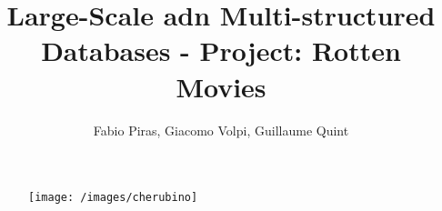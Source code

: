 

\author{Fabio Piras, Giacomo Volpi, Guillaume Quint}
\title{Large-Scale adn Multi-structured Databases - Project: Rotten Movies}
\date{}

\begin{figure}
\centering
\texttt{[image: /images/cherubino]}

\end{figure}

\maketitle


\newpage

\tableofcontents






















